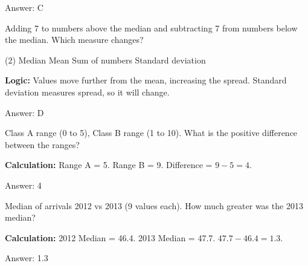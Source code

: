 \documentclass[11pt,paper=a4,answers]{exam}
\begin{document}
\begin{questions}
\begin{solution}
\vspace{30pt}

Answer: \colorbox{yellow!100}{C}
\end{solution}

\vspace{60pt}

\question
Adding 7 to numbers above the median and subtracting 7 from numbers below the median. Which measure changes?
\begin{tasks}(2)
    \task Median
    \task Mean
    \task Sum of numbers
    \task Standard deviation
\end{tasks}

\begin{solution}
\textbf{Logic:} Values move further from the mean, increasing the spread. Standard deviation measures spread, so it will change.

\vspace{30pt}

Answer: \colorbox{yellow!100}{D}
\end{solution}

\vspace{60pt}

\question
Class A range (0 to 5), Class B range (1 to 10). What is the positive difference between the ranges?

\begin{solution}
\textbf{Calculation:} Range A = 5. Range B = 9. Difference = $9 - 5 = 4$.

\vspace{30pt}

Answer: \colorbox{yellow!100}{4}
\end{solution}

\vspace{60pt}

\question
Median of arrivals 2012 vs 2013 (9 values each). How much greater was the 2013 median?

\begin{solution}
\textbf{Calculation:} 2012 Median = 46.4. 2013 Median = 47.7. $47.7 - 46.4 = 1.3$.

\vspace{30pt}

Answer: \colorbox{yellow!100}{1.3}
\end{solution}


\end{questions}
\end{document}
